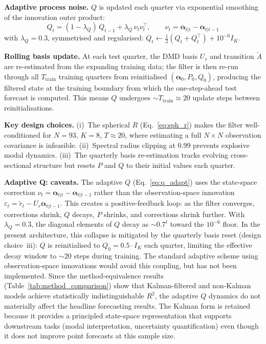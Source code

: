 \documentclass[11pt,a4paper]{article}
\newcommand{\balpha}{\bm{\alpha}}
\begin{document}
\textbf{Adaptive process noise.} $Q$ is updated each quarter via exponential smoothing of the innovation outer product:
\begin{equation}
Q_t = (1 - \lambda_Q)\, Q_{t-1} + \lambda_Q \, \nu_t \nu_t^\top, \qquad
\nu_t = \balpha_{t|t} - \balpha_{t|t-1}
\label{eq:q_adapt}
\end{equation}
with $\lambda_Q = 0.3$, symmetrised and regularised: $Q_t \leftarrow \frac{1}{2}(Q_t + Q_t^\top) + 10^{-6} I_K$.

\textbf{Rolling basis update.} At each test quarter, the DMD basis $U_r$ and transition $\tilde{A}$ are re-estimated from the expanding training data; the filter is then re-run through all $T_{\mathrm{train}}$ training quarters from reinitialised $(\balpha_0, P_0, Q_0)$, producing the filtered state at the training boundary from which the one-step-ahead test forecast is computed. This means $Q$ undergoes ${\sim}T_{\mathrm{train}} \approx 20$ update steps between reinitialisations.

\textbf{Key design choices.} (i)~The spherical $R$ (Eq.~\ref{eq:sph_r}) makes the filter well-conditioned for $N = 93$, $K = 8$, $T \approx 20$, where estimating a full $N \times N$ observation covariance is infeasible. (ii)~Spectral radius clipping at 0.99 prevents explosive modal dynamics. (iii)~The quarterly basis re-estimation tracks evolving cross-sectional structure but resets $P$ and $Q$ to their initial values each quarter.

\textbf{Adaptive Q: caveats.} The adaptive $Q$ (Eq.~\ref{eq:q_adapt}) uses the state-space correction $\nu_t = \balpha_{t|t} - \balpha_{t|t-1}$ rather than the observation-space innovation $\varepsilon_t = \tilde{r}_t - U_r \balpha_{t|t-1}$. This creates a positive-feedback loop: as the filter converges, corrections shrink, $Q$ decays, $P$ shrinks, and corrections shrink further. With $\lambda_Q = 0.3$, the diagonal elements of $Q$ decay as ${\sim}0.7^t$ toward the $10^{-6}$ floor. In the present architecture, this collapse is mitigated by the quarterly basis reset (design choice~iii): $Q$ is reinitialised to $Q_0 = 0.5 \cdot I_K$ each quarter, limiting the effective decay window to ${\sim}20$ steps during training. The standard \citet{mehra1970identification} adaptive scheme using observation-space innovations would avoid this coupling, but has not been implemented. Since the method-equivalence results (Table~\ref{tab:method_comparison}) show that Kalman-filtered and non-Kalman models achieve statistically indistinguishable $R^2$, the adaptive $Q$ dynamics do not materially affect the headline forecasting results. The Kalman form is retained because it provides a principled state-space representation that supports downstream tasks (modal interpretation, uncertainty quantification) even though it does not improve point forecasts at this sample size.
\end{document}
